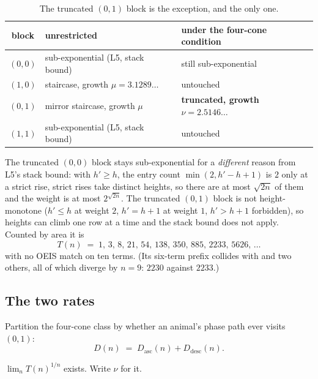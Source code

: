 \documentclass[11pt]{article}
\begin{document}
\begin{table}[H]
\centering\small
\begin{tabular}{c l l}
\toprule
block & unrestricted & under the four-cone condition \\
\midrule
$(0,0)$ & sub-exponential (L5, stack bound) & still sub-exponential \\
$(1,0)$ & staircase, growth $\mu = 3.1289\dots$ & untouched \\
$(0,1)$ & mirror staircase, growth $\mu$ & \textbf{truncated, growth $\nu = 2.5146\dots$} \\
$(1,1)$ & sub-exponential (L5, stack bound) & untouched \\
\bottomrule
\end{tabular}
\caption{The truncated $(0,1)$ block is the exception, and the only one.}
\label{tab:subdom}
\end{table}

The truncated $(0,0)$ block stays sub-exponential for a \emph{different} reason
from L5's stack bound: with $h' \ge h$, the entry count
$\min(2, h'-h+1)$ is $2$ only at a strict rise, strict rises take distinct
heights, so there are at most $\sqrt{2n}$ of them and the weight is at most
$2^{\sqrt{2n}}$. The truncated $(0,1)$ block is not height-monotone ($h' \le
h$ at weight $2$, $h' = h+1$ at weight $1$, $h' > h+1$ forbidden), so heights
can climb one row at a time and the stack bound does not apply. Counted
by area it is
\[
  T(n) \;=\; 1,\, 3,\, 8,\, 21,\, 54,\, 138,\, 350,\, 885,\, 2233,\, 5626,\, \dots
\]
with no OEIS match on ten terms. (Its six-term prefix collides with
 and two others, all of which diverge by $n = 9$: $2230$ against
$2233$.)

\subsection{The two rates}

Partition the four-cone class by whether an animal's phase path ever visits
$(0,1)$:
\[
  D(n) \;=\; D_{\mathrm{asc}}(n) + D_{\mathrm{desc}}(n).
\]

\begin{lemma}
\label{lem:T}
$\lim_n T(n)^{1/n}$ exists. Write $\nu$ for it.
\end{lemma}
\end{document}
